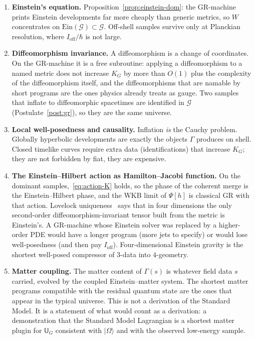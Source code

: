 \documentclass[11pt,a4paper]{article}
\theoremstyle{plain}
\theoremstyle{definition}
\theoremstyle{remark}
\newcommand{\Geo}{\mathcal{G}}
\newcommand{\KG}{K_{G}}
\newcommand{\UTM}{\mathsf{U}_{G}}
\newcommand{\ket}[1]{\lvert#1\rangle}
\begin{document}
\begin{enumerate}
  \item \textbf{Einstein's equation.}
  Proposition~\ref{prop:einstein-dom}: the GR-machine prints Einstein developments far more cheaply than generic metrics, so $W$ concentrates on $\mathrm{Ein}(\Geo)\subset\Geo$.
  Off-shell samples survive only at Planckian resolution, where $I_{\mathrm{off}}/\hbar$ is not large.

  \item \textbf{Diffeomorphism invariance.}
  A diffeomorphism is a change of coordinates.
  On the GR-machine it is a free subroutine: applying a diffeomorphism to a named metric does not increase $\KG$ by more than $O(1)$ plus the complexity of the diffeomorphism itself, and the diffeomorphisms that are namable by short programs are the ones physics already treats as gauge.
  Two samples that inflate to diffeomorphic spacetimes are identified in $\Geo$ (Postulate~\ref{post:gr}), so they are the same universe.

  \item \textbf{Local well-posedness and causality.}
  Inflation \emph{is} the Cauchy problem.
  Globally hyperbolic developments are exactly the objects $\Gamma$ produces on shell.
  Closed timelike curves require extra data (identifications) that increase $\KG$; they are not forbidden by fiat, they are expensive.

  \item \textbf{The Einstein--Hilbert action as Hamilton--Jacobi function.}
  On the dominant samples,~\eqref{eq:action-K} holds, so the phase of the coherent merge is the Einstein--Hilbert phase, and the WKB limit of $\Psi[h]$ is classical GR with that action.
  Lovelock uniqueness~\cite{lovelock1971} says that in four dimensions the only second-order diffeomorphism-invariant tensor built from the metric is Einstein's.
  A GR-machine whose Einstein solver was replaced by a higher-order PDE would have a longer program (more jets to specify) or would lose well-posedness (and then pay $I_{\mathrm{off}}$).
  Four-dimensional Einstein gravity is the shortest well-posed compressor of $3$-data into $4$-geometry.

  \item \textbf{Matter coupling.}
  The matter content of $\Gamma(s)$ is whatever field data $s$ carried, evolved by the coupled Einstein--matter system.
  The shortest matter programs compatible with the residual quantum state are the ones that appear in the typical universe.
  This is not a derivation of the Standard Model.
  It is a statement of what would count as a derivation: a demonstration that the Standard Model Lagrangian is a shortest matter plugin for $\UTM$ consistent with $\ket{\Omega}$ and with the observed low-energy sample.
\end{enumerate}
\end{document}
